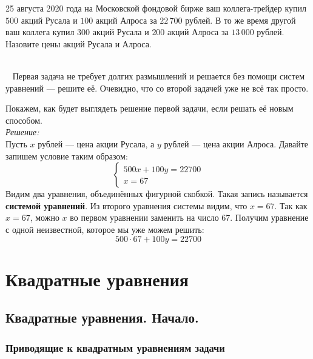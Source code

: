 \documentclass[11pt,fleqn]{book} %
\begin{document}
\begin{problem}
25 августа 2020 года на Московской фондовой бирже ваш коллега-трейдер купил $500$ акций Русала и $100$ акций Алроса за $22\,700$ рублей. В то же время другой ваш коллега купил $300$ акций Русала и $200$ акций Алроса за $13\,000$ рублей. Назовите цены акций Русала и Алроса.
\end{problem}
~\\~
Первая задача не требует долгих размышлений и решается без помощи систем уравнений --- решите её. Очевидно, что со второй задачей уже не всё так просто.

Покажем, как будет выглядеть решение первой задачи, если решать её новым способом.
~\\ \textit{Решение:} ~\\
Пусть $x$ рублей --- цена акции Русала, а $y$ рублей --- цена акции Алроса. Давайте запишем условие таким образом:
$$
\begin{cases}
500x + 100y = 22700\\
x = 67
\end{cases}
$$
Видим два уравнения, объединённых фигурной скобкой. Такая запись называется \textbf{системой уравнений}. Из второго уравнения системы видим, что $x = 67$. Так как $x = 67$, можно $x$ во первом уравнении заменить на число $67$. Получим уравнение с одной неизвестной, которое мы уже можем решить:
$$
500\cdot 67 + 100y = 22700
$$





\part{Квадратные уравнения}

\chapter{Квадратные уравнения. Начало.}

\section{Приводящие к квадратным уравнениям задачи}
\end{document}
